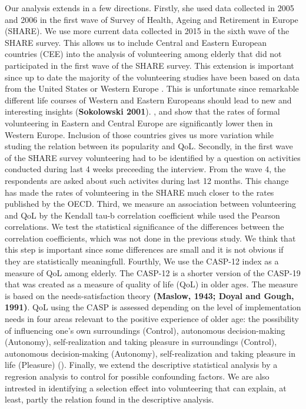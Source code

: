 \documentclass[10pt, letterpaper]{article}
\begin{document}
\begin{spacing}{1.4}
Our analysis extends \citet{haski09} in a few directions. Firstly, she used data collected in 2005 and 2006 in the first wave of Survey of Health, Ageing and Retirement in Europe (SHARE). We use more current data collected in 2015 in the sixth wave of the SHARE survey. This allows us to include Central and Eastern European countries (CEE) into the analysis of volunteering among elderly that did not participated in the first wave of the SHARE survey. This extension is important since up to date the majority of the volunteering studies have been based on data from the United States or Western Europe \citep{casiday08}. This is unfortunate since remarkable different life courses of Western and Eastern Europeans should lead to new and interesting insights (\textbf{Sokolowski 2001}). \citet{plagnol10}, \citet{Oecd16} and \citet{Oecd15} show that the rates of formal volunteering in Eastern and Central Europe are significantly lower then in Western Europe. Inclusion of those countries gives us more variation while studing the relation between its popularity and QoL. Secondly, in the first wave of the SHARE survey volunteering had to be identified by a question on activities conducted during last 4 weeks preceeding the interview. From the wave 4, the respondents are asked about such activites during last 12 months. This change has made the rates of volunteering in the SHARE much closer to the rates published by the OECD. Third, we measure an association between volunteering and QoL by the Kendall tau-b correlation coefficient while \citet{haski09} used the Pearson correlations. We test the statistical significance of the differences between the correlation coefficients, which was not done in the previous study. We think that this step is important since some differences are small and it is not obvious if they are statistically meaningfull. Fourthly, We use the CASP-12 index as a measure of QoL among elderly. The CASP-12 is a shorter version of the CASP-19 that was created as a measure of quality of life (QoL) in older ages. The measure is based on the needs-satisfaction theory \textbf{(Maslow, 1943; Doyal and Gough, 1991)}. QoL using the CASP is assessed depending on the level of implementation needs in four areas relevant to the positive experience of older age: the possibility of influencing one's own  surroundings (Control), autonomous decision-making (Autonomy), self-realization and taking pleasure in	surroundings (Control), autonomous decision-making (Autonomy), self-realization and taking pleasure in  life (Pleasure) (\cite{hyde03}). Finally, we extend the descriptive statistical analysis by a regresion analysis to control for possible confounding factors. We are also intrested in identifying a selection effect into volunteering that can explain, at least, partly the relation found in the descriptive analysis.  


\end{spacing}
\end{document}
